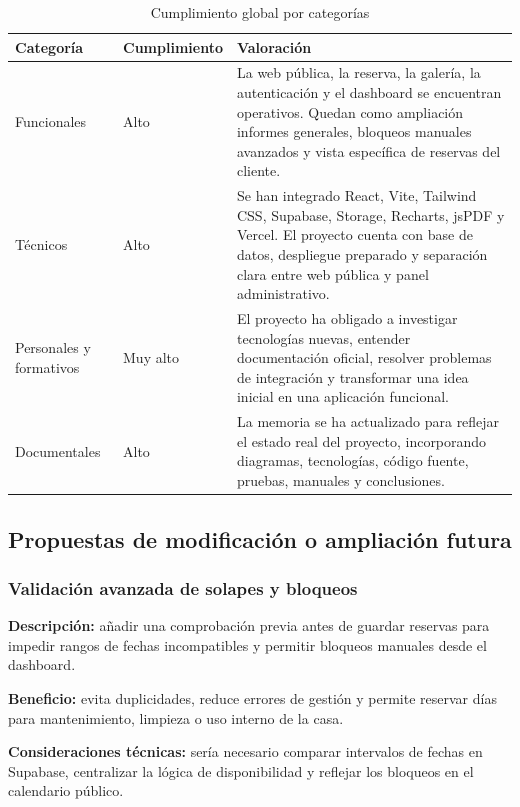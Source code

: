 \documentclass[11pt,a4paper]{article}
\begin{document}
\begin{table}[H]
\centering
\small
\begin{tabularx}{\textwidth}{|p{3cm}|p{3.2cm}|X|}
\hline
\textbf{Categoría} & \textbf{Cumplimiento} & \textbf{Valoración} \\
\hline
Funcionales & Alto & La web pública, la reserva, la galería, la autenticación y el dashboard se encuentran operativos. Quedan como ampliación informes generales, bloqueos manuales avanzados y vista específica de reservas del cliente. \\
\hline
Técnicos & Alto & Se han integrado React, Vite, Tailwind CSS, Supabase, Storage, Recharts, jsPDF y Vercel. El proyecto cuenta con base de datos, despliegue preparado y separación clara entre web pública y panel administrativo. \\
\hline
Personales y formativos & Muy alto & El proyecto ha obligado a investigar tecnologías nuevas, entender documentación oficial, resolver problemas de integración y transformar una idea inicial en una aplicación funcional. \\
\hline
Documentales & Alto & La memoria se ha actualizado para reflejar el estado real del proyecto, incorporando diagramas, tecnologías, código fuente, pruebas, manuales y conclusiones. \\
\hline
\end{tabularx}
\caption{Cumplimiento global por categorías}
\end{table}

\subsection{Propuestas de modificación o ampliación futura}
\subsubsection{Validación avanzada de solapes y bloqueos}
\textbf{Descripción:} añadir una comprobación previa antes de guardar reservas para impedir rangos de fechas incompatibles y permitir bloqueos manuales desde el dashboard.

\textbf{Beneficio:} evita duplicidades, reduce errores de gestión y permite reservar días para mantenimiento, limpieza o uso interno de la casa.

\textbf{Consideraciones técnicas:} sería necesario comparar intervalos de fechas en Supabase, centralizar la lógica de disponibilidad y reflejar los bloqueos en el calendario público.
\end{document}
